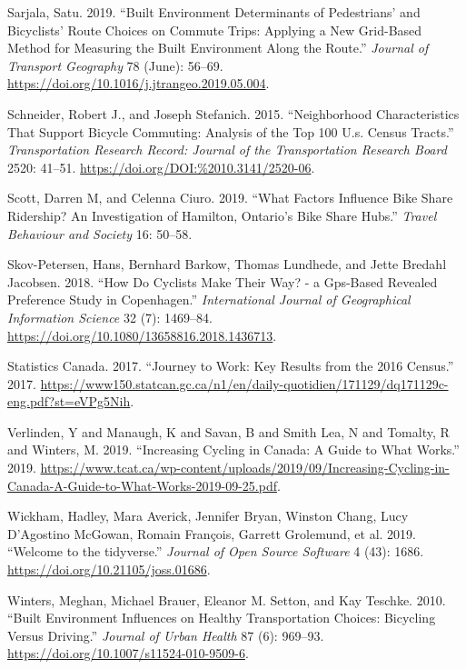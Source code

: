 \documentclass[smallextended]{svjour3}       %
\begin{document}
\leavevmode\hypertarget{ref-Sarjala2019}{}%
Sarjala, Satu. 2019. ``Built Environment Determinants of Pedestrians'
and Bicyclists' Route Choices on Commute Trips: Applying a New
Grid-Based Method for Measuring the Built Environment Along the Route.''
\emph{Journal of Transport Geography} 78 (June): 56--69.
\url{https://doi.org/10.1016/j.jtrangeo.2019.05.004}.

\leavevmode\hypertarget{ref-Schneider2015}{}%
Schneider, Robert J., and Joseph Stefanich. 2015. ``Neighborhood
Characteristics That Support Bicycle Commuting: Analysis of the Top 100
U.s. Census Tracts.'' \emph{Transportation Research Record: Journal of
the Transportation Research Board} 2520: 41--51.
\url{https://doi.org/DOI:\%2010.3141/2520-06}.

\leavevmode\hypertarget{ref-Scott2019factors}{}%
Scott, Darren M, and Celenna Ciuro. 2019. ``What Factors Influence Bike
Share Ridership? An Investigation of Hamilton, Ontario's Bike Share
Hubs.'' \emph{Travel Behaviour and Society} 16: 50--58.

\leavevmode\hypertarget{ref-SkovPetersen2018}{}%
Skov-Petersen, Hans, Bernhard Barkow, Thomas Lundhede, and Jette Bredahl
Jacobsen. 2018. ``How Do Cyclists Make Their Way? - a Gps-Based Revealed
Preference Study in Copenhagen.'' \emph{International Journal of
Geographical Information Science} 32 (7): 1469--84.
\url{https://doi.org/10.1080/13658816.2018.1436713}.

\leavevmode\hypertarget{ref-Statscan2017}{}%
Statistics Canada. 2017. ``Journey to Work: Key Results from the 2016
Census.'' 2017.
\url{https://www150.statcan.gc.ca/n1/en/daily-quotidien/171129/dq171129c-eng.pdf?st=eVPg5Nih}.

\leavevmode\hypertarget{ref-Verlinden2019}{}%
Verlinden, Y and Manaugh, K and Savan, B and Smith Lea, N and Tomalty, R
and Winters, M. 2019. ``Increasing Cycling in Canada: A Guide to What
Works.'' 2019.
\url{https://www.tcat.ca/wp-content/uploads/2019/09/Increasing-Cycling-in-Canada-A-Guide-to-What-Works-2019-09-25.pdf}.

\leavevmode\hypertarget{ref-Wickham2019}{}%
Wickham, Hadley, Mara Averick, Jennifer Bryan, Winston Chang, Lucy
D'Agostino McGowan, Romain François, Garrett Grolemund, et al. 2019.
``Welcome to the tidyverse.'' \emph{Journal of Open Source Software} 4
(43): 1686. \url{https://doi.org/10.21105/joss.01686}.

\leavevmode\hypertarget{ref-Winters2010}{}%
Winters, Meghan, Michael Brauer, Eleanor M. Setton, and Kay Teschke.
2010. ``Built Environment Influences on Healthy Transportation Choices:
Bicycling Versus Driving.'' \emph{Journal of Urban Health} 87 (6):
969--93. \url{https://doi.org/10.1007/s11524-010-9509-6}.
\end{document}
